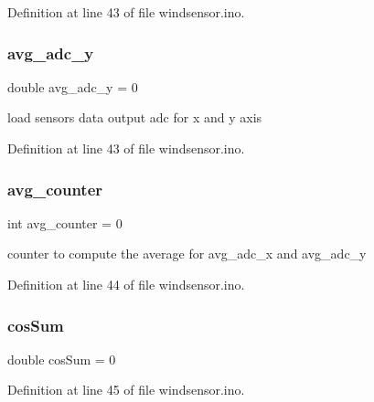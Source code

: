 Definition at line 43 of file windsensor.\+ino.

\mbox{\label{windsensor_8ino_a9721778a8fa458f3ae824eceb7d8f703}} 
\subsubsection{\texorpdfstring{avg\+\_\+adc\+\_\+y}{avg\_adc\_y}}
{\footnotesize\ttfamily double avg\+\_\+adc\+\_\+y = 0\hspace{0.3cm}{\ttfamily [static]}}

load sensors data output adc for x and y axis 

Definition at line 43 of file windsensor.\+ino.

\mbox{\label{windsensor_8ino_a7f1aa577037cdb41a6226fd5f24143be}} 
\subsubsection{\texorpdfstring{avg\+\_\+counter}{avg\_counter}}
{\footnotesize\ttfamily int avg\+\_\+counter = 0\hspace{0.3cm}{\ttfamily [static]}}

counter to compute the average for avg\+\_\+adc\+\_\+x and avg\+\_\+adc\+\_\+y 

Definition at line 44 of file windsensor.\+ino.

\mbox{\label{windsensor_8ino_ae99d45425d50ae8be8137abd39020329}} 
\subsubsection{\texorpdfstring{cos\+Sum}{cosSum}}
{\footnotesize\ttfamily double cos\+Sum = 0\hspace{0.3cm}{\ttfamily [static]}}



Definition at line 45 of file windsensor.\+ino.

